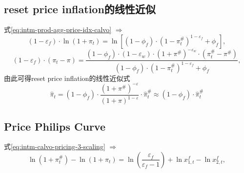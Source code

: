 \subsection{reset price inflation的线性近似}
\label{sec:reset-price-inflation-lin}
式\eqref{eq:intm-prod-agg-price-idx-calvo} $\Rightarrow$
\begin{equation*}
\left( 1-\varepsilon_f \right) \cdot \ln \left(1+\pi_t\right) = \ln \left[\left(1-\phi_f\right) \cdot \left(1 - \pi^{\#}_t\right)^{1-\varepsilon_f} + \phi_f\right],
\end{equation*}
\begin{equation*}
\left( 1-\varepsilon_f \right) \cdot \left(\pi_t - \pi \right) =
\frac{\left(1-\phi_f\right) \cdot \left(1-\varepsilon_w\right) \cdot \left( 1+\pi^{\#} \right)^{-\varepsilon_w} \cdot \left(\pi^{\#}_t - \pi^{\#}\right)}{\left(1-\phi_f\right) \cdot \left(1 - \pi^{\#}_t\right)^{1-\varepsilon_f} + \phi_f},
\end{equation*}
由此可得reset price inflation的线性近似式
\begin{equation}
\label{eq:reset-price-inflation-inflation-lin}
\hat{\pi}_t = \left(1-\phi_f \right) \cdot \frac{\left(1+\pi^{\#}\right)^{-\varepsilon}}{\left(1+\pi\right)^{1-\varepsilon}} \cdot \hat{\pi}^{\#}_t \approx \left(1-\phi_f \right) \cdot \hat{\pi}^{\#}_t
\end{equation}


\subsection{Price Philips Curve}
式\eqref{eq:intm-calvo-pricing-3-scaling} $\Rightarrow$
\begin{equation*}
\ln \left( 1+\pi^{\#}_t \right) - \ln \left(1+\pi_t\right) = \ln \left(\frac{\varepsilon_f}{\varepsilon_f -1}\right) + \ln x^f_{1,t} - \ln x^f_{2,t},
\end{equation*}

